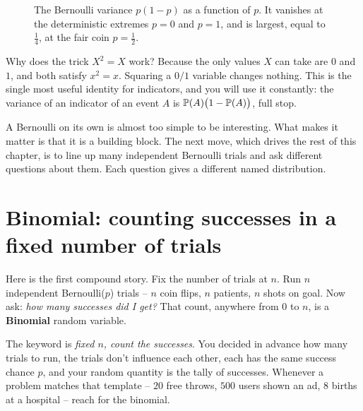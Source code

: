 \begin{figure}[H]
\centering
{}
\caption{The Bernoulli variance $p(1-p)$ as a function of $p$. It vanishes at the
deterministic extremes $p=0$ and $p=1$, and is largest, equal to $\tfrac14$, at the
fair coin $p=\tfrac12$.}
\label{ch07:fig-bern-var}
\end{figure}

\begin{whybox}
Why does the trick $X^2 = X$ work? Because the only values $X$ can take are $0$
and $1$, and both satisfy $x^2 = x$. Squaring a $0/1$ variable changes nothing.
This is the single most useful identity for indicators, and you will use it
constantly: the variance of an indicator of an event $A$ is
$\P(A)\bigl(1 - \P(A)\bigr)$, full stop.
\end{whybox}

A Bernoulli on its own is almost too simple to be interesting. What makes it
matter is that it is a building block. The next move, which drives the rest of
this chapter, is to line up many independent Bernoulli trials and ask different
questions about them. Each question gives a different named distribution.

\section{Binomial: counting successes in a fixed number of trials}
\label{ch07:binomial}

Here is the first compound story. Fix the number of trials at $n$. Run $n$
independent Bernoulli($p$) trials -- $n$ coin flips, $n$ patients, $n$ shots on
goal. Now ask: \emph{how many successes did I get?} That count, anywhere from $0$
to $n$, is a \textbf{Binomial} random variable.

\begin{intuitionbox}
The keyword is \emph{fixed $n$, count the successes}. You decided in advance how
many trials to run, the trials don't influence each other, each has the same
success chance $p$, and your random quantity is the tally of successes. Whenever a
problem matches that template -- $20$ free throws, $500$ users shown an ad, $8$
births at a hospital -- reach for the binomial.
\end{intuitionbox}

